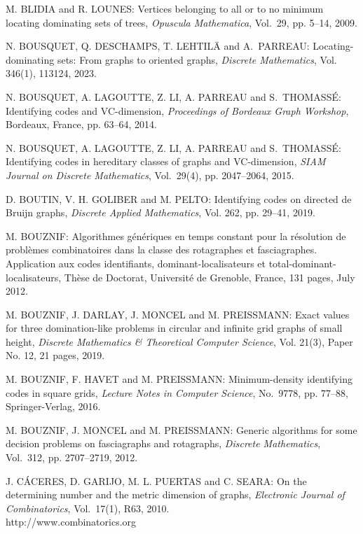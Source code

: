 \begin{thebibliography}{999}
M. BLIDIA and R. LOUNES: Vertices belonging to all or to no minimum locating dominating sets of trees, {\it Opuscula Mathematica}, Vol.~29, pp. 5--14, 2009.

N. BOUSQUET, Q. DESCHAMPS, T. LEHTIL\"A and A.~PARREAU: Locating-dominating sets: {F}rom graphs to oriented graphs, {\it Discrete Mathematics}, Vol. 346(1), 113124, 2023. 

N. BOUSQUET, A. LAGOUTTE, Z. LI, A. PARREAU and S.~THO\-MASS\'E: Identifying codes and VC-dimension, {\it Proceedings of Bordeaux Graph Workshop}, Bordeaux, France, pp. 63--64, 2014.

N. BOUSQUET, A. LAGOUTTE, Z. LI, A. PARREAU and S.~THO\-MASS\'E: Identifying codes in hereditary classes of graphs and VC-dimension, {\it SIAM Journal on Discrete Mathematics}, Vol.~29(4), pp. 2047--2064, 2015.

D. BOUTIN, V. H. GOLIBER and M. PELTO: Identifying codes on directed de Bruijn graphs, {\it Discrete Applied Mathematics}, Vol. 262, pp. 29--41, 2019.

M. BOUZNIF: Algorithmes g\'en\'eriques en temps constant pour la r\'eso\-lution de probl\`emes combinatoires dans la classe des rotagraphes et fasciagraphes. Application aux codes identifiants, dominant-localisateurs et total-dominant-localisateurs, Th\`ese de Doctorat, Universit\'e de Grenoble, France, 131 pages, July 2012.

M. BOUZNIF, J. DARLAY, J. MONCEL and M. PREISSMANN: Exact values for three domination-like problems in circular and infinite grid graphs of small height, {\it Discrete Mathematics \& Theoretical Computer Science}, Vol. 21(3), Paper No. 12, 21 pages, 2019.

M. BOUZNIF, F. HAVET and M. PREISSMANN: Minimum-density identifying codes in square grids, {\it Lecture Notes in Computer Science}, No.~9778, pp. 77--88, Springer-Verlag, 2016.

M. BOUZNIF, J. MONCEL and M. PREISSMANN: Generic algorithms for some decision problems on fasciagraphs and rotagraphs, {\it Discrete Mathematics}, Vol.~312, pp. 2707--2719, 2012.

J. C\'ACERES, D. GARIJO, M. L. PUERTAS and C. SEARA: On the determining number and the metric dimension of graphs, {\it Electronic Journal of Combinatorics}, Vol.~17(1), R63, 2010.\\
http://www.combinatorics.org


\end{thebibliography}
